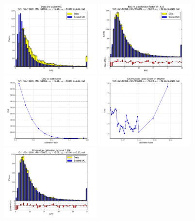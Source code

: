 
 \begin{figure}[htbp] \begin{center} 
\includegraphics[width=0.45\textwidth]{../FIGURES/101/FIG_Data_and_scaled_MC.pdf} 
\includegraphics[width=0.45\textwidth]{../FIGURES/101/FIG_Best_fit_at_calibration_factor_of_1_522.pdf} 
\includegraphics[width=0.45\textwidth]{../FIGURES/101/FIG_Chi2_vs_calib_factor.pdf} 
\includegraphics[width=0.45\textwidth]{../FIGURES/101/FIG_Chi2_vs_calib_factor_Zoom_on_chi2min.pdf} 
\includegraphics[width=0.45\textwidth]{../FIGURES/101/FIG_Fit_result_for_calibration_factor_of_1_526.pdf} 

\end{center}
\end{figure}
